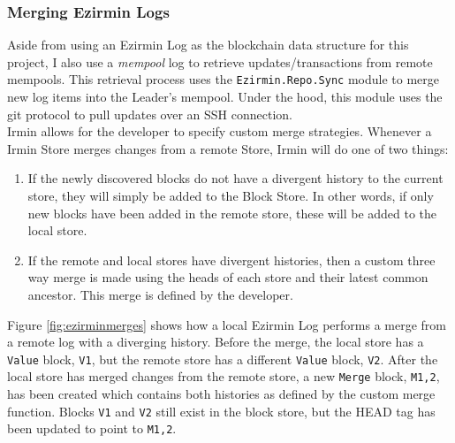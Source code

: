 \documentclass[12pt,a4paper,twoside,openright]{report}
\begin{document}
	\subsubsection*{Merging Ezirmin Logs}
	Aside from using an Ezirmin Log as the blockchain data structure for this project, I also use a \textit{mempool} log to retrieve updates/transactions from remote mempools. 
	This retrieval process uses the \texttt{Ezirmin.Repo.Sync} module to merge new log items into the Leader's mempool.
	Under the hood, this module uses the git protocol to pull updates over an SSH connection.\\
	
	Irmin allows for the developer to specify custom merge strategies. 
	Whenever a Irmin Store merges changes from a remote Store, Irmin will do one of two things:
	\begin{enumerate}
		\item If the newly discovered blocks do not have a divergent history to the current store, they will simply be added to the Block Store. 
			In other words, if only new blocks have been added in the remote store, these will be added to the local store. 
		\item If the remote and local stores have divergent histories, then a custom three way merge is made using the heads of each store and their latest common ancestor.
			This merge is defined by the developer.
	\end{enumerate}
	Figure \ref{fig:ezirminmerges} shows how a local Ezirmin Log performs a merge from a remote log with a diverging history.
	Before the merge, the local store has a \texttt{Value} block, \texttt{V1}, but the remote store has a different \texttt{Value} block, \texttt{V2}.
	After the local store has merged changes from the remote store, a new \texttt{Merge} block, \texttt{M1,2}, has been created which contains both histories as defined by the custom merge function. 
	Blocks \texttt{V1} and \texttt{V2} still exist in the block store, but the HEAD tag has been updated to point to \texttt{M1,2}.
\end{document}
